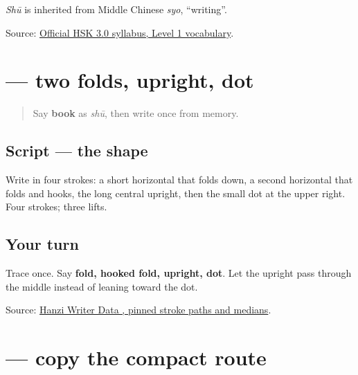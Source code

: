 \emph{Shū} is inherited from Middle Chinese \emph{syo}, \textquotedblleft{}writing\textquotedblright{}.

\begin{tcolorbox}[breakable,colback=teal!4,colframe=teal!35!black,title={Before you move on}]
Source: \href{https://hsk.cn-bj.ufileos.com/3.0/\%E6\%96\%B0\%E7\%89\%88HSK\%E8\%80\%83\%E8\%AF\%95\%E5\%A4\%A7\%E7\%BA\%B21219.pdf}{Official HSK 3.0 syllabus, Level 1 vocabulary}.
\end{tcolorbox}
\section[\texorpdfstring{\zh{书} (shū)}{书 (shū)}]{ — two folds, upright, dot}

\label{lesson:ZH-W18-shu-observe}



\begin{quote}
Say \textbf{book} as \emph{shū}, then write  once from memory.
\end{quote}

\subsection*{Script — the shape}

Write \textbf{} in four strokes: a short horizontal that folds down, a second horizontal that folds and hooks, the long central upright, then the small dot at the upper right. Four strokes; three lifts.

\subsection*{Your turn}
Trace \textbf{} once. Say \textbf{fold, hooked fold, upright, dot}. Let the upright pass through the middle instead of leaning toward the dot.

\begin{tcolorbox}[breakable,colback=teal!4,colframe=teal!35!black,title={Before you move on}]
Source: \href{https://raw.githubusercontent.com/chanind/hanzi-writer-data/68d10a4b21150cae5e1ebbd223eed289cf32d90c/data/\%E4\%B9\%A6.json}{Hanzi Writer Data , pinned stroke paths and medians}.
\end{tcolorbox}
\section[\texorpdfstring{\zh{书} (shū)}{书 (shū)}]{ — copy the compact route}


